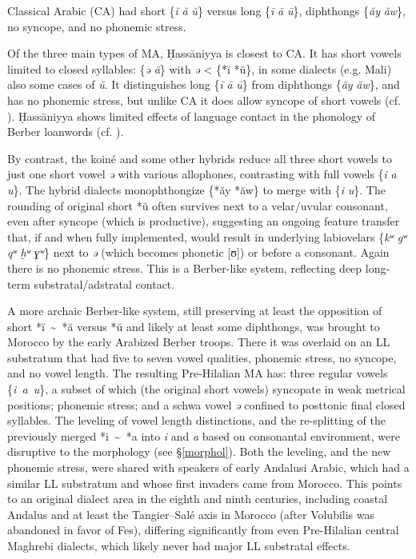 \documentclass[output=paper]{langsci/langscibook}
\begin{document}
Classical Arabic (CA) had short \{\textit{ĭ} \textit{ă} \textit{ŭ}\} versus long \{\textit{ī} \textit{ā} \textit{ū}\}, diphthongs \{\textit{ăy} \textit{ăw}\}, no syncope, and no phonemic stress. 

Of the three main types of MA, Ḥassāniyya is closest to CA. It has short vowels limited to closed syllables: \{\textit{ə} \textit{ă}\} with \textit{ə} < \{*ĭ *ŭ\}, in some dialects (e.g. Mali) also some cases of \textit{ŭ}. It distinguishes long \{\textit{ī} \textit{ā} \textit{ū}\} from diphthongs \{\textit{ăy} \textit{ăw}\}, and has no phonemic stress, but unlike CA it does allow syncope of short vowels (cf. \citealt{Taine-Cheikh1988article}). Ḥassāniyya shows limited effects of language contact in the phonology of Berber loanwords (cf. \citealt{Taine-Cheikh1997Zenaga}).

By contrast, the koiné and some other hybrids reduce all three short vowels to just one short vowel \textit{ə} with various allophones, contrasting with full vowels \{\textit{i} \textit{a} \textit{u}\}. The hybrid dialects monophthongize \{*ăy *ăw\} to merge with \{\textit{i} \textit{u}\}. The rounding of original short *ŭ often survives next to a velar/uvular consonant, even after syncope (which is productive), suggesting an ongoing feature transfer that, if and when fully implemented, would result in underlying labiovelars \{\textit{kʷ} \textit{gʷ} \textit{qʷ} \textit{ḫʷ} \textit{ɣʷ}\} next to \textit{ə} (which becomes phonetic [ʊ]) or before a consonant. Again there is no phonemic stress. This is a Berber-like system, reflecting deep long-term substratal/adstratal contact.

A more archaic Berber-like system, still preserving at least the opposition of short *ĭ~{\textasciitilde}~*ă versus *ŭ and likely at least some diphthongs, was brought to Morocco by the early Arabized Berber troops. There it was overlaid on an LL substratum that had five to seven vowel qualities, phonemic stress, no syncope, and no vowel length. The resulting Pre-Hilalian MA has: three regular vowels \{\textit{i~a~u}\}, a subset of which (the original short vowels) syncopate in weak metrical positions; phonemic stress; and a schwa vowel \textit{ə} confined to posttonic final closed syllables. The leveling of vowel length distinctions, and the re-splitting of the previously merged *i~{\textasciitilde}~*a into \textit{i} and \textit{a} based on consonantal environment, were disruptive to the morphology (see §\ref{morphol}). Both the leveling, and the new phonemic stress, were shared with speakers of early Andalusi Arabic, which had a similar LL substratum and whose first invaders came from Morocco. This points to an original dialect area in the eighth and ninth centuries, including coastal Andalus and at least the Tangier–Salé axis in Morocco (after Volubilis was abandoned in favor of Fes), differing significantly from even Pre-Hilalian central Maghrebi dialects, which likely never had major LL substratal effects. 
\end{document}
